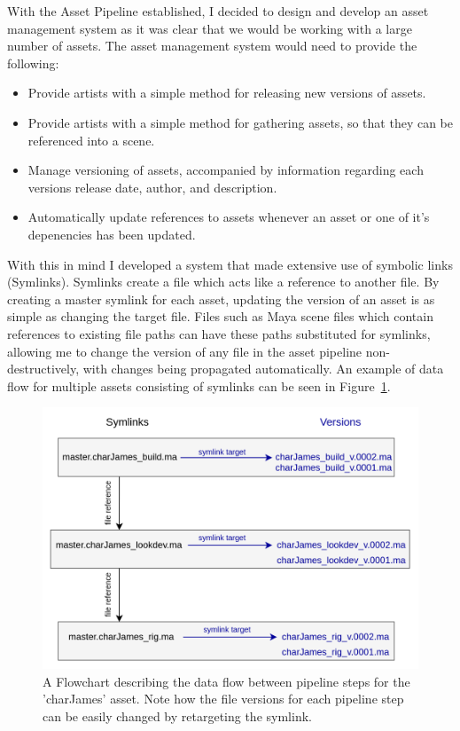 \documentclass[11pt]{article}
\begin{document}
With the Asset Pipeline established, I decided to design and develop an asset management system as it was clear that we would be working with a large number of assets. The asset management system would need to provide the following:

\begin{itemize}

\item Provide artists with a simple method for releasing new versions of assets.

\item Provide artists with a simple method for gathering assets, so that they can be referenced into a scene.

\item Manage versioning of assets, accompanied by information regarding each versions release date, author, and  description.

\item Automatically update references to assets whenever an asset or one of it's depenencies has been updated.

\end{itemize}

With this in mind I developed a system that made extensive use of symbolic links (Symlinks). Symlinks create a file which acts like a reference to another file. By creating a master symlink for each asset, updating the version of an asset is as simple as changing the target file. Files such as Maya scene files which contain references to existing file paths can have these paths substituted for symlinks, allowing me to change the version of any file in the asset pipeline non-destructively, with changes being propagated automatically. An example of data flow for multiple assets consisting of symlinks can be seen in Figure~\ref{figure:assetPipeline}.

\begin{figure}[htbp]\centering
	\includegraphics[width=1.0\linewidth]{images/asset_pipeline.png}
	\caption{\label{figure:assetPipeline} A Flowchart describing the data flow between pipeline steps for the 'charJames' asset. Note how the file versions for each pipeline step can be easily changed by retargeting the symlink.}
\end{figure}
\end{document}

